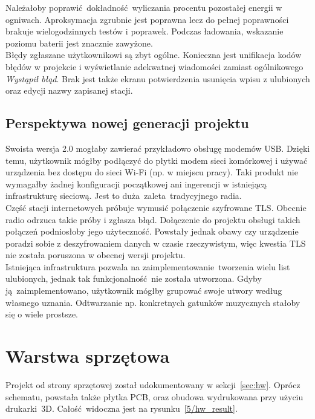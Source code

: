 \documentclass[12pt]{report}
\begin{document}
			Należałoby poprawić dokładność wyliczania procentu pozostałej energii w ogniwach. Aproksymacja zgrubnie jest poprawna lecz do pełnej poprawności brakuje wielogodzinnych testów i poprawek. Podczas ładowania, wskazanie poziomu baterii jest znacznie zawyżone.
			$ $\\
			
			Błędy zgłaszane użytkownikowi są zbyt ogólne. Konieczna jest unifikacja kodów błędów w projekcie i wyświetlanie adekwatnej wiadomości zamiast ogólnikowego \textit{Wystąpił błąd}. Brak jest także ekranu potwierdzenia usunięcia wpisu z ulubionych oraz edycji nazwy zapisanej stacji.
		
		\subsection{Perspektywa nowej generacji projektu}
			Swoista wersja 2.0 mogłaby zawierać przykładowo obsługę modemów USB. Dzięki temu, użytkownik mógłby podłączyć do płytki modem sieci komórkowej i używać urządzenia bez dostępu do sieci Wi-Fi (np. w miejscu pracy). Taki produkt nie wymagałby żadnej konfiguracji początkowej ani ingerencji w istniejącą infrastrukturę sieciową. Jest to duża zaleta tradycyjnego radia.
			$ $\\
			
			Część stacji internetowych próbuje wymusić połączenie szyfrowane TLS. Obecnie radio odrzuca takie próby i zgłasza błąd. Dołączenie do projektu obsługi takich połączeń podniosłoby jego użyteczność. Powstały jednak obawy czy urządzenie poradzi sobie z deszyfrowaniem danych w czasie rzeczywistym, więc kwestia TLS nie została poruszona w obecnej wersji projektu.
			$ $\\
			
			Istniejąca infrastruktura pozwala na zaimplementowanie tworzenia wielu list ulubionych, jednak tak funkcjonalność nie została utworzona. Gdyby ją zaimplementowano, użytkownik mógłby grupować swoje utwory według własnego uznania. Odtwarzanie np. konkretnych gatunków muzycznych stałoby się o wiele prostsze.
			
	\section{Warstwa sprzętowa}
		Projekt od strony sprzętowej został udokumentowany w sekcji~\ref{sec:hw}. Oprócz schematu, powstała także płytka PCB, oraz obudowa wydrukowana przy użyciu drukarki~3D. Całość widoczna jest na rysunku~\ref{5/hw_result}.
		
\end{document}
